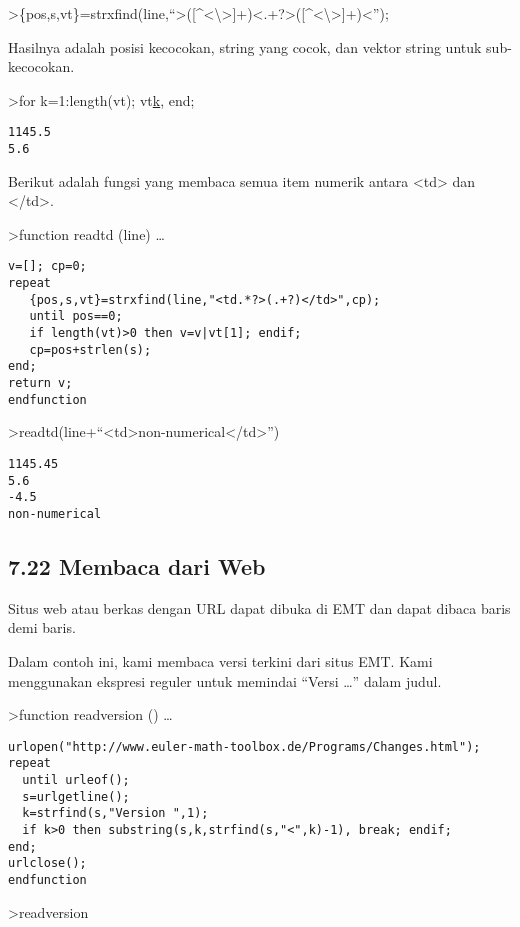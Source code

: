 \documentclass[
]{book}
\begin{document}
\textgreater\{pos,s,vt\}=strxfind(line,``\textgreater({[}\^{}\textless\textbackslash\textgreater{]}+)\textless.+?\textgreater({[}\^{}\textless\textbackslash\textgreater{]}+)\textless{}'');

Hasilnya adalah posisi kecocokan, string yang cocok, dan vektor string untuk sub-kecocokan.

\textgreater for k=1:length(vt); vt\href{}{k}, end;

\begin{verbatim}
1145.5
5.6
\end{verbatim}

Berikut adalah fungsi yang membaca semua item numerik antara \textless td\textgreater{} dan \textless/td\textgreater.

\textgreater function readtd (line) \ldots{}

\begin{verbatim}
v=[]; cp=0;
repeat
   {pos,s,vt}=strxfind(line,"<td.*?>(.+?)</td>",cp);
   until pos==0;
   if length(vt)>0 then v=v|vt[1]; endif;
   cp=pos+strlen(s);
end;
return v;
endfunction
\end{verbatim}

\textgreater readtd(line+``\textless td\textgreater non-numerical\textless/td\textgreater{}'')

\begin{verbatim}
1145.45
5.6
-4.5
non-numerical
\end{verbatim}

\subsection{7.22 Membaca dari Web}\label{membaca-dari-web}

Situs web atau berkas dengan URL dapat dibuka di EMT dan dapat dibaca baris demi baris.

Dalam contoh ini, kami membaca versi terkini dari situs EMT. Kami menggunakan ekspresi reguler untuk memindai ``Versi \ldots{}'' dalam judul.

\textgreater function readversion () \ldots{}

\begin{verbatim}
urlopen("http://www.euler-math-toolbox.de/Programs/Changes.html");
repeat
  until urleof();
  s=urlgetline();
  k=strfind(s,"Version ",1);
  if k>0 then substring(s,k,strfind(s,"<",k)-1), break; endif;
end;
urlclose();
endfunction
\end{verbatim}

\textgreater readversion
\end{document}
